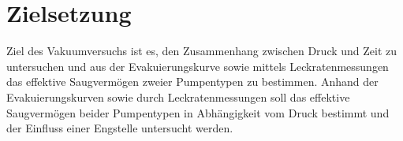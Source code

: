 \section{Zielsetzung}
\label{sec:zielsetzung}

Ziel des Vakuumversuchs ist es, den Zusammenhang zwischen Druck und Zeit zu
untersuchen und aus der Evakuierungskurve sowie mittels Leckratenmessungen das
effektive Saugvermögen zweier Pumpentypen zu bestimmen. Anhand der 
Evakuierungskurven sowie durch Leckratenmessungen soll das effektive Saugvermögen
beider Pumpentypen in Abhängigkeit vom Druck bestimmt und der Einfluss einer
Engstelle untersucht werden.